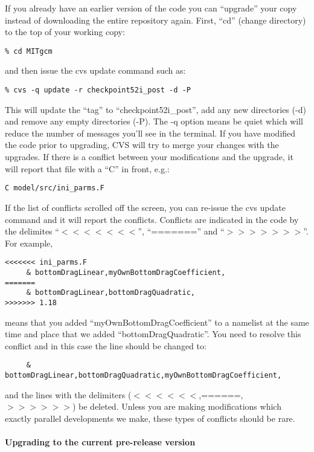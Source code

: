 If you already have an earlier version of the code you can ``upgrade''
your copy instead of downloading the entire repository again. First,
``cd'' (change directory) to the top of your working copy:
\begin{verbatim}
% cd MITgcm
\end{verbatim}
and then issue the cvs update command such as:
\begin{verbatim}
% cvs -q update -r checkpoint52i_post -d -P
\end{verbatim}
This will update the ``tag'' to ``checkpoint52i\_post'', add any new
directories (-d) and remove any empty directories (-P). The -q option
means be quiet which will reduce the number of messages you'll see in
the terminal. If you have modified the code prior to upgrading, CVS
will try to merge your changes with the upgrades. If there is a
conflict between your modifications and the upgrade, it will report
that file with a ``C'' in front, e.g.:
\begin{verbatim}
C model/src/ini_parms.F
\end{verbatim}
If the list of conflicts scrolled off the screen, you can re-issue the
cvs update command and it will report the conflicts. Conflicts are
indicated in the code by the delimites ``$<<<<<<<$'', ``======='' and
``$>>>>>>>$''. For example,
{\small
\begin{verbatim}
<<<<<<< ini_parms.F
     & bottomDragLinear,myOwnBottomDragCoefficient,
=======
     & bottomDragLinear,bottomDragQuadratic,
>>>>>>> 1.18
\end{verbatim}
}
means that you added ``myOwnBottomDragCoefficient'' to a namelist at
the same time and place that we added ``bottomDragQuadratic''. You
need to resolve this conflict and in this case the line should be
changed to:
{\small
\begin{verbatim}
     & bottomDragLinear,bottomDragQuadratic,myOwnBottomDragCoefficient,
\end{verbatim}
}
and the lines with the delimiters ($<<<<<<$,======,$>>>>>>$) be deleted.
Unless you are making modifications which exactly parallel
developments we make, these types of conflicts should be rare.

\paragraph*{Upgrading to the current pre-release version}

